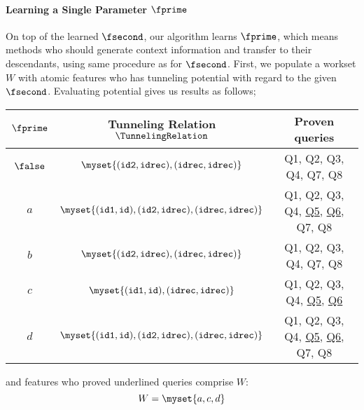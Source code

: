 \paragraph{Learning a Single Parameter $\fprime$}On top of the learned $\fsecond$, our algorithm learns $\fprime$, which means methods who should generate context information and transfer to their descendants, using same procedure as for $\fsecond$. First, we populate a workset $W$ with atomic features who has tunneling potential with regard to the given $\fsecond$. Evaluating potential gives us results as follows;
\begin{center}
\begin{tabular}{c|c|c}
  \hline
  $\fprime$ & Tunneling Relation $\TunnelingRelation$ & Proven queries\\
  \hline \hline
  $\false$ & $\myset{({\tt id2}, {\tt idrec}), ({\tt idrec}, {\tt idrec})}$ & Q1, Q2, Q3, Q4, Q7, Q8 \\
  $a$ & $\myset{({\tt id1}, {\tt id}), ({\tt id2}, {\tt idrec}), ({\tt idrec}, {\tt idrec})}$ & Q1, Q2, Q3, Q4, \underline{Q5}, \underline{Q6}, Q7, Q8\\
  $b$ & $\myset{({\tt id2}, {\tt idrec}), ({\tt idrec}, {\tt idrec})}$ & Q1, Q2, Q3, Q4, Q7, Q8 \\
  $c$ & $\myset{({\tt id1}, {\tt id}), ({\tt idrec}, {\tt idrec})}$ & Q1, Q2, Q3, Q4, \underline{Q5}, \underline{Q6} \\
  $d$ & $\myset{({\tt id1}, {\tt id}), ({\tt id2}, {\tt idrec}), ({\tt idrec}, {\tt idrec})}$ & Q1, Q2, Q3, Q4, \underline{Q5}, \underline{Q6}, Q7, Q8 \\
  \hline
\end{tabular}
\end{center}
and features who proved underlined queries comprise $W$:
\[
W=\myset{a, c, d}
\]

